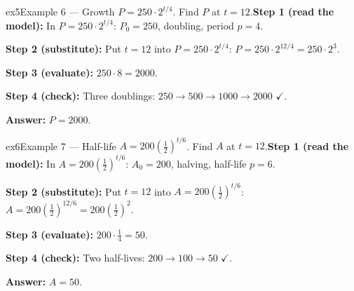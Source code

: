 \documentclass[11pt]{article}
\begin{document}
\begin{example}{ex5}{Example 6 --- Growth}
$P=250\cdot2^{t/4}$. Find $P$ at $t=12$.\soln \textbf{Step 1 (read the model):} In $P=250\cdot2^{t/4}$: $P_0=250$, doubling, period $p=4$.

\textbf{Step 2 (substitute):} Put $t=12$ into $P=250\cdot2^{t/4}$: $P=250\cdot2^{12/4}=250\cdot2^3$.

\textbf{Step 3 (evaluate):} $250\cdot8=2000$.

\textbf{Step 4 (check):} Three doublings: $250\to500\to1000\to2000$ $\checkmark$.

\textbf{Answer:} $P=2000$.

\end{example}

\begin{example}{ex6}{Example 7 --- Half-life}
$A=200\left(\tfrac12\right)^{t/6}$. Find $A$ at $t=12$.\soln \textbf{Step 1 (read the model):} In $A=200\left(\tfrac12\right)^{t/6}$: $A_0=200$, halving, half-life $p=6$.

\textbf{Step 2 (substitute):} Put $t=12$ into $A=200\left(\tfrac12\right)^{t/6}$: $A=200\left(\tfrac12\right)^{12/6}=200\left(\tfrac12\right)^2$.

\textbf{Step 3 (evaluate):} $200\cdot\tfrac14=50$.

\textbf{Step 4 (check):} Two half-lives: $200\to100\to50$ $\checkmark$.

\textbf{Answer:} $A=50$.

\end{example}
\end{document}
